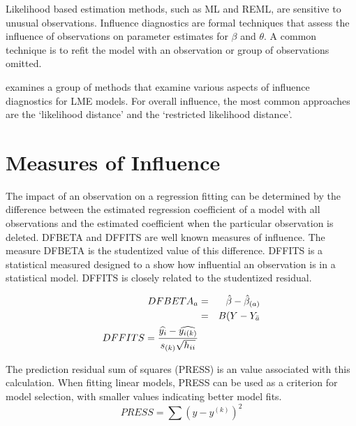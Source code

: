 \documentclass[12pt, a4paper]{report}
\theoremstyle{plain}
\theoremstyle{definition}
\theoremstyle{remark}
\begin{document}
Likelihood based estimation methods, such as ML and REML, are sensitive to unusual observations. Influence diagnostics are formal techniques that assess the influence of observations on parameter estimates for $\beta$ and $\theta$. A common technique is to refit the model with an observation or group of observations omitted.

\citet{west} examines a group of methods that examine various aspects of influence diagnostics for LME models.
For overall influence, the most common approaches are the `likelihood distance' and the `restricted likelihood distance'.




\section{Measures of Influence} 

The impact of an observation on a regression fitting can be determined by the difference between the estimated regression coefficient of a model with all observations and the estimated coefficient when the particular observation is deleted. DFBETA and DFFITS are well known measures of influence. The measure DFBETA is the studentized value of this difference. DFFITS is a statistical measured designed to a show how influential an observation is in a statistical model. DFFITS is closely related to the studentized residual.

\begin{eqnarray}
DFBETA_{a} &=& \hat{\beta} - \hat{\beta}_{(a)} \\
&=& B(Y-Y_{\bar{a}}
\\ DFFITS = {\widehat{y_i} -
	\widehat{y_{i(k)}} \over s_{(k)} \sqrt{h_{ii}}} 
\end{eqnarray}

The prediction residual sum of squares (PRESS) is an value associated with this calculation. When fitting linear models, PRESS can be used as a criterion for model selection, with smaller values indicating better model fits.
\begin{displaymath}
PRESS = \sum(y-y^{(k)})^2
\end{displaymath}
%	
%	
\end{document}
